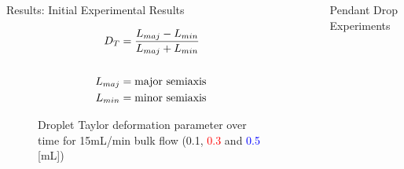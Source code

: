 \documentclass[final]{beamer}
\newlength{\sepwidth}
\newlength{\colwidth}
\newcommand{\separatorcolumn}{\begin{column}{\sepwidth}\end{column}}
\begin{document}
\begin{frame}[t]
\begin{columns}[t]
\begin{column}{\colwidth}
\begin{block}{Results: Initial Experimental Results}
\begin{figure}
\begin{minipage}{0.6\textwidth}
        \end{minipage}
        \hspace{0.1\textwidth}
        \vspace{-0.5cm}
        \begin{minipage}{0.2\textwidth}
            \centering
            \begin{align*}
                \small
                \centering
                D_T &= \frac{L_{maj} - L_{min}}{L_{maj} + L_{min}} \\ \\
                L_{maj} &= \text{major semiaxis} \\ 
                L_{min} &= \text{minor semiaxis}
            \end{align*}
            \normalsize
        \end{minipage}
        \caption{Droplet Taylor deformation parameter over time for 15mL/min bulk flow (0.1, \textcolor{red}{0.3} and \textcolor{blue}{0.5} [mL])}
        \label{fig:TaylorDeformation}
    \end{figure}

  \end{block}

\end{column}

\separatorcolumn

\begin{column}{\colwidth}

  \begin{block}{Pendant Drop Experiments}
    

\end{block}
\end{column}
\end{columns}
\end{frame}
\end{document}
